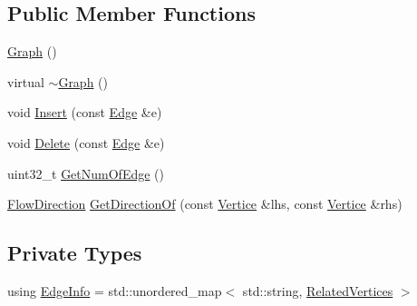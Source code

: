 \subsection*{Public Member Functions}
\begin{DoxyCompactItemize}
\item 
\hyperlink{classapollo_1_1cyber_1_1service__discovery_1_1Graph_a50698f103057f739a4651ea2a16bbe19}{Graph} ()
\item 
virtual \hyperlink{classapollo_1_1cyber_1_1service__discovery_1_1Graph_a28c666ff84beff1b107455a920ea1c6b}{$\sim$\-Graph} ()
\item 
void \hyperlink{classapollo_1_1cyber_1_1service__discovery_1_1Graph_a5b20125a0bcfbebd47b2bb68c2b43961}{Insert} (const \hyperlink{classapollo_1_1cyber_1_1service__discovery_1_1Edge}{Edge} \&e)
\item 
void \hyperlink{classapollo_1_1cyber_1_1service__discovery_1_1Graph_a921bf81cecef62fe5621ac45042f0589}{Delete} (const \hyperlink{classapollo_1_1cyber_1_1service__discovery_1_1Edge}{Edge} \&e)
\item 
uint32\-\_\-t \hyperlink{classapollo_1_1cyber_1_1service__discovery_1_1Graph_a2dd897c1c5d12192c4ed6128617be573}{Get\-Num\-Of\-Edge} ()
\item 
\hyperlink{namespaceapollo_1_1cyber_1_1service__discovery_a463f9fa98e31287620adc568e1299c79}{Flow\-Direction} \hyperlink{classapollo_1_1cyber_1_1service__discovery_1_1Graph_a8046937e5ba9c37966c1146cca73149b}{Get\-Direction\-Of} (const \hyperlink{classapollo_1_1cyber_1_1service__discovery_1_1Vertice}{Vertice} \&lhs, const \hyperlink{classapollo_1_1cyber_1_1service__discovery_1_1Vertice}{Vertice} \&rhs)
\end{DoxyCompactItemize}
\subsection*{Private Types}
\begin{DoxyCompactItemize}
\item 
using \hyperlink{classapollo_1_1cyber_1_1service__discovery_1_1Graph_ac45189064420abb326708f92fa17205a}{Edge\-Info} = std\-::unordered\-\_\-map$<$ std\-::string, \hyperlink{structapollo_1_1cyber_1_1service__discovery_1_1Graph_1_1RelatedVertices}{Related\-Vertices} $>$
\end{DoxyCompactItemize}
